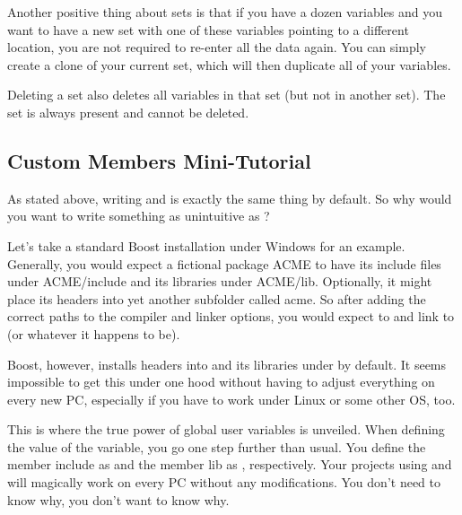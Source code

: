 Another positive thing about sets is that if you have a dozen variables and you want to have a new set with one of these variables pointing to a different location, you are not required to re-enter all the data again. You can simply create a clone of your current set, which will then duplicate all of your variables.

Deleting a set also deletes all variables in that set (but not in another set). The  set is always present and cannot be deleted.

\subsection{Custom Members Mini-Tutorial}\label{sec:mini_tutorial}

As stated above, writing  and  is exactly the same thing by default. So why would you want to write something as unintuitive as ?

Let's take a standard Boost installation under Windows for an example. Generally, you would expect a fictional package ACME to have its include files under ACME/include and its libraries under ACME/lib. Optionally, it might place its headers into yet another subfolder called acme. So after adding the correct paths to the compiler and linker options, you would expect to  and link to  (or whatever it happens to be).

Boost, however, installs headers into  and its libraries under  by default. It seems impossible to get this under one hood without having to adjust everything on every new PC, especially if you have to work under Linux or some other OS, too.

This is where the true power of global user variables is unveiled. When defining the value of the  variable, you go one step further than usual. You define the member include as  and the member lib as , respectively. Your projects using  and  will magically work on every PC without any modifications. You don't need to know why, you don't want to know why.
